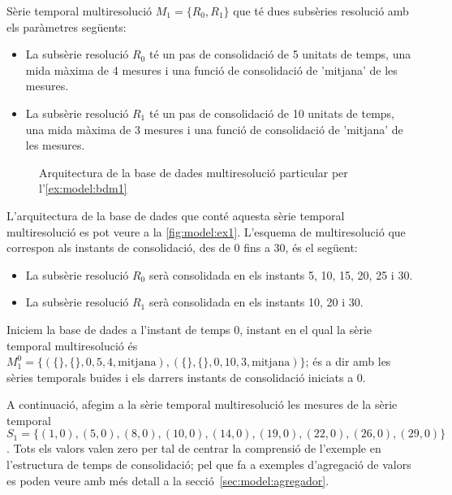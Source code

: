 \begin{example} 
\label{ex:model:bdm1}%


Sèrie temporal multiresolució $M_1=\{R_0,R_1\}$ que té dues subsèries
resolució amb els paràmetres següents:
\begin{itemize}
\item La subsèrie resolució $R_0$ té un pas de consolidació de 5
  unitats de temps, una mida màxima de 4 mesures i una funció de
  consolidació de 'mitjana' de les mesures.
\item La subsèrie resolució $R_1$ té un pas de consolidació de 10
  unitats de temps, una mida màxima de 3 mesures i una funció de
  consolidació de 'mitjana' de les mesures.
\end{itemize}

\begin{figure}[tp]
\centering

\caption{Arquitectura de la base de dades multiresolució particular
  per l'\autoref{ex:model:bdm1}}
\label{fig:model:ex1}
\end{figure}

L'arquitectura de la base de dades que conté aquesta sèrie temporal
multiresolució es pot veure a la \autoref{fig:model:ex1}. 
 L'esquema
de multiresolució que correspon als instants de consolidació, des de 0
fins a 30, és el següent:
\begin{itemize}
\item La subsèrie resolució $R_0$ serà consolidada en els instants 5,
  10, 15, 20, 25 i 30.
\item La subsèrie resolució $R_1$ serà consolidada en els instants 10,
  20 i 30.
\end{itemize}


Iniciem la base de dades a l'instant de temps 0, instant en el qual la
sèrie temporal multiresolució és $M_1^0 = \{ ( \{\} , \{\} , 0 , 5 ,4
, \text{mitjana} ) , ( \{\} , \{\} , 0 , 10 ,3 , \text{mitjana} ) \}$;
és a dir amb les sèries temporals buides i els darrers instants de
consolidació iniciats a 0.




A continuació, afegim a la sèrie temporal multiresolució les mesures
de la sèrie temporal $S_1=\{
(1,0),(5,0),(8,0),(10,0),(14,0),(19,0),(22,0),(26,0),(29,0) \}$. Tots
els valors valen zero per tal de centrar la comprensió de l'exemple en
l'estructura de temps de consolidació; pel que fa a exemples
d'agregació de valors es poden veure amb més detall a la
secció~\ref{sec:model:agregador}.



\end{example}
